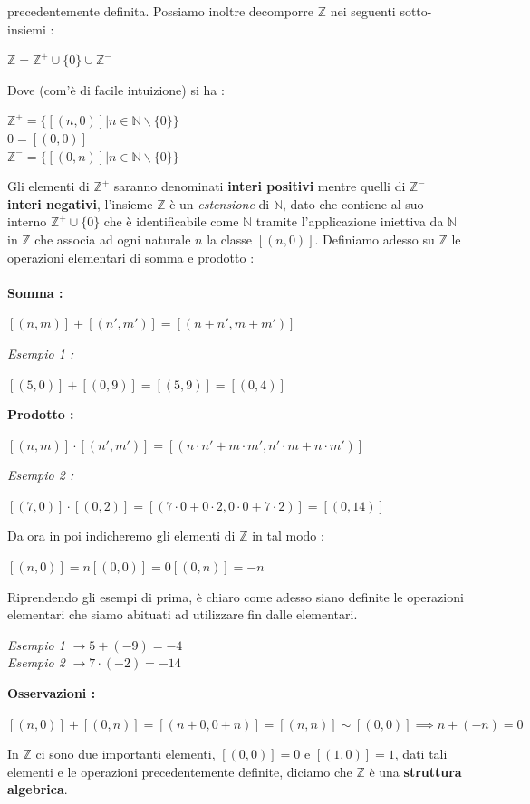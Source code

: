 \documentclass[12pt, letterpaper]{article}
\begin{document}
precedentemente definita. Possiamo inoltre decomporre \(\mathbb{Z}\) nei seguenti sotto-insiemi :
\begin{center}
    \(\mathbb{Z} = \mathbb{Z}^+ \cup \{0\}\cup \mathbb{Z}^-\)
\end{center} 
Dove (com'è di facile intuizione) si ha :
\begin{center}
    \(\mathbb{Z}^+ =\{ [(n,0)] | n \in \mathbb{N}\backslash\{0\}\}\)\\
    \(0=[(0,0)]\)\hphantom{aaaaaaaaaaaaa.}\\
    \(\mathbb{Z}^- =\{ [(0,n)] | n \in \mathbb{N}\backslash\{0\}\}\)
\end{center} 
Gli elementi di \(\mathbb{Z}^+\) saranno denominati \textbf{interi positivi} mentre quelli 
di \(\mathbb{Z}^-\) \textbf{interi negativi}, l'insieme \(\mathbb{Z}\) è un \textit{estensione} di \(\mathbb{N}\), 
dato che contiene al suo interno  \(\mathbb{Z}^+ \cup \{0\}\) che è identificabile come \(\mathbb{N}\) tramite l'applicazione
iniettiva da \(\mathbb{N}\) in \(\mathbb{Z}\) che associa ad ogni naturale \(n\) la classe \([(n,0)]\). 
Definiamo adesso su \(\mathbb{Z}\) le operazioni elementari di somma e prodotto :
\\\hphantom{.}\\\textbf{Somma : }\\
\begin{center}
    \([(n,m)]+[(n',m')] = [(n+n',m+m')]\)
\end{center}
\textit{Esempio 1 : }
\begin{center}
    \([(5,0)]+[(0,9)] = [(5,9)] = [(0,4)]\) 
\end{center}
\textbf{Prodotto : }\\
\begin{center}
    \([(n,m)]\cdot[(n',m')] = [(n\cdot n'+m\cdot m',n'\cdot m+n\cdot m')]\)
\end{center}
\textit{Esempio 2 : }
\begin{center}
    \([(7,0)]\cdot[(0,2)] = [(7\cdot 0+0\cdot 2,0\cdot 0+7\cdot 2)]=[(0,14)]\)
\end{center}
Da ora in poi indicheremo gli elementi di \(\mathbb{Z}\) in tal modo :
\begin{center}
\( [(n,0)] = n \)\hphantom{spac}\( [(0,0)] = 0 \)\hphantom{spac}\( [(0,n)] = -n \)
\end{center}
Riprendendo gli esempi di prima, è chiaro come adesso siano definite le operazioni elementari che siamo 
abituati ad utilizzare fin dalle elementari.\\
\begin{center}
    \textit{Esempio 1 } \(\rightarrow 5+(-9)=-4\) \\
    \textit{Esempio 2 } \(\rightarrow 7\cdot (-2)=-14\) 
\end{center}
\textbf{Osservazioni : }
\begin{center}
    \( [(n,0)]+[(0,n)] = [(n+0,0+n)]=[(n,n)]\sim[(0,0)]\implies     n + (-n) = 0\)
\end{center}
In \(\mathbb{Z}\) ci sono due importanti elementi, \([(0,0)]=0\) e \([(1,0)]=1\), dati tali elementi e le operazioni
precedentemente definite, diciamo che \(\mathbb{Z}\) è una \textbf{struttura algebrica}.\newpage
\end{document}
